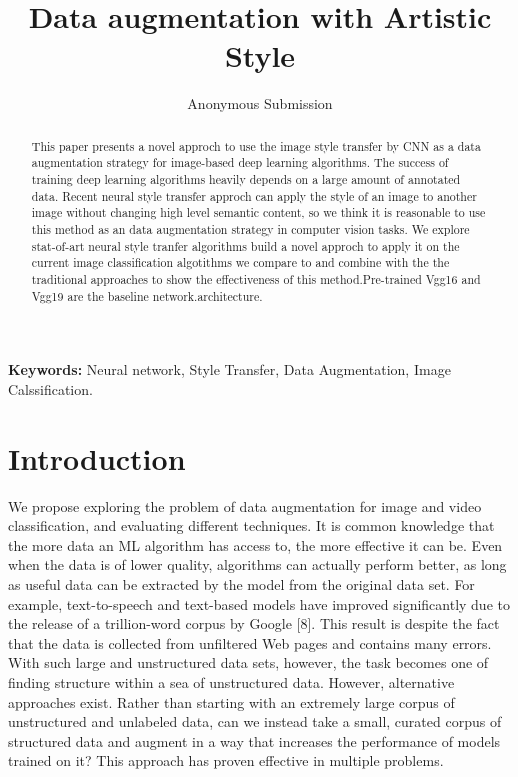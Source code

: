 \documentclass[a4paper,11pt]{article}
\begin{document}
\title{Data augmentation with Artistic Style }

\author{Anonymous Submission}
\date{}
\maketitle
\thispagestyle{empty}



\begin{abstract}
This paper presents a novel approch to use the image style transfer by CNN as a data augmentation strategy for image-based deep learning algorithms. The success of training deep learning algorithms heavily depends on a large amount of annotated data. Recent neural style transfer approch can apply the style of an image to another image without changing high level semantic content, so we think it is reasonable to use this method as an data augmentation strategy in computer vision tasks. We explore stat-of-art neural style tranfer algorithms build a novel approch to apply it on the current image classification algotithms we compare to and combine with the the traditional approaches to show the effectiveness of this method.Pre-trained Vgg16 and Vgg19 are the baseline network.architecture.
\end{abstract}
\textbf{Keywords:} Neural network, Style Transfer, Data Augmentation, Image Calssification.

\section{Introduction}
We propose exploring the problem of data augmentation for image and video classiﬁcation, and evaluating different techniques. It is common knowledge that the more data an ML algorithm has access to, the more effective it can be. Even when the data is of lower quality, algorithms can actually perform better, as long as useful data can be extracted by the model from the original data set. For example, text-to-speech and text-based models have improved signiﬁcantly due to the release of a trillion-word corpus by Google [8]. This result is despite the fact that the data is collected from unﬁltered Web pages and contains many errors. With such large and unstructured data sets, however, the task becomes one of ﬁnding structure within a sea of unstructured data. However, alternative approaches exist. Rather than starting with an extremely large corpus of unstructured and unlabeled data, can we instead take a small, curated corpus of structured data and augment in a way that increases the performance of models trained on it? This approach has proven effective in multiple problems.
\end{document}
